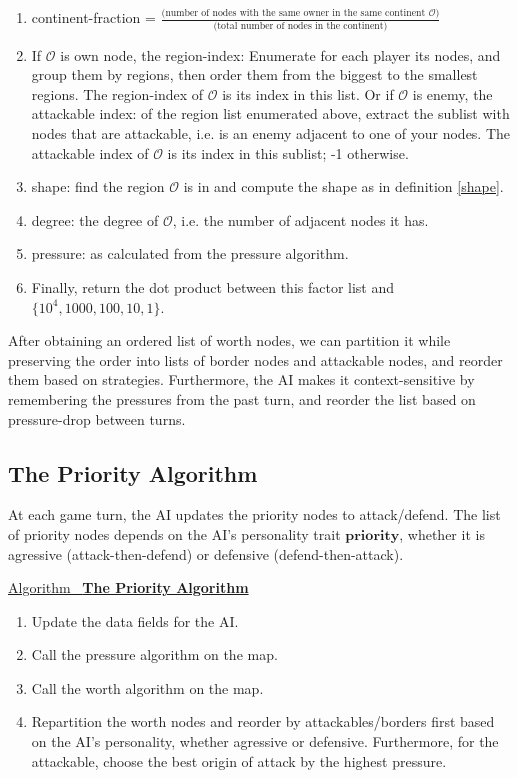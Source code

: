 \documentclass[12pt]{article}  %
\newcommand{\algtitle}[1]{\underline{Algorithm \ {\bf #1}} \vspace*{1mm}\\}
\begin{document}
\begin{enumerate}
	\item continent-fraction = $\frac{\text{(number of nodes with the same owner in the same continent $\mathcal{O}$)}}{\text{(total number of nodes in the continent)}}$
	\item If $\mathcal{O}$ is own node, the region-index: Enumerate for each player its nodes, and group them by regions, then order them from the biggest to the smallest regions. The region-index of $\mathcal{O}$ is its index in this list. Or if $\mathcal{O}$ is enemy, the attackable index: of the region list enumerated above, extract the sublist with nodes that are attackable, i.e. is an enemy adjacent to one of your nodes. The attackable index of $\mathcal{O}$ is its index in this sublist; -1 otherwise.
	\item shape: find the region $\mathcal{O}$ is in and compute the shape as in definition \ref{shape}.
	\item degree: the degree of $\mathcal{O}$, i.e. the number of adjacent nodes it has.
	\item pressure: as calculated from the pressure algorithm.
	\item Finally, return the dot product between this factor list and $\{10^{4}, 1000, 100, 10, 1\}$.
\end{enumerate}


After obtaining an ordered list of worth nodes, we can partition it while preserving the order into lists of border nodes and attackable nodes, and reorder them based on strategies. Furthermore, the AI makes it context-sensitive by remembering the pressures from the past turn, and reorder the list based on pressure-drop between turns.





\subsection{The Priority Algorithm}
At each game turn, the AI updates the priority nodes to attack/defend. The list of priority nodes depends on the AI's personality trait $\textbf{priority}$, whether it is agressive (attack-then-defend) or defensive (defend-then-attack).

\algtitle{The Priority Algorithm}
\begin{enumerate}
	\item Update the data fields for the AI.
	\item Call the pressure algorithm on the map.
	\item Call the worth algorithm on the map.
	\item Repartition the worth nodes and reorder by attackables/borders first based on the AI's personality, whether agressive or defensive. Furthermore, for the attackable, choose the best origin of attack by the highest pressure.
\end{enumerate}
\end{document}
